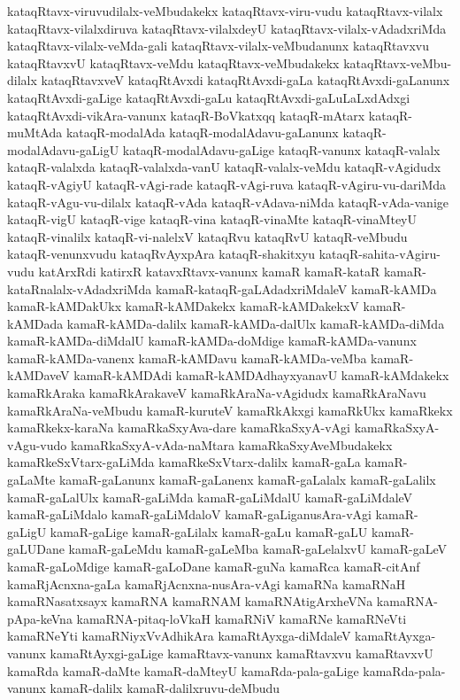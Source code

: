 {kataqRtavx-viruvudilalx-veMbudakekx
kataqRtavx-viru-vudu
kataqRtavx-vilalx
kataqRtavx-vilalxdiruva
kataqRtavx-vilalxdeyU
kataqRtavx-vilalx-vAdadxriMda
kataqRtavx-vilalx-veMda-gali
kataqRtavx-vilalx-veMbudanunx
kataqRtavxvu
kataqRtavxvU
kataqRtavx-veMdu
kataqRtavx-veMbudakekx
kataqRtavx-veMbu-dilalx
kataqRtavxveV
kataqRtAvxdi
kataqRtAvxdi-gaLa
kataqRtAvxdi-gaLanunx
kataqRtAvxdi-gaLige
kataqRtAvxdi-gaLu
kataqRtAvxdi-gaLuLaLxdAdxgi
kataqRtAvxdi-vikAra-vanunx
kataqR-BoVkatxqq
kataqR-mAtarx
kataqR-muMtAda
kataqR-modalAda
kataqR-modalAdavu-gaLanunx
kataqR-modalAdavu-gaLigU
kataqR-modalAdavu-gaLige
kataqR-vanunx
kataqR-valalx
kataqR-valalxda
kataqR-valalxda-vanU
kataqR-valalx-veMdu
kataqR-vAgidudx
kataqR-vAgiyU
kataqR-vAgi-rade
kataqR-vAgi-ruva
kataqR-vAgiru-vu-dariMda
kataqR-vAgu-vu-dilalx
kataqR-vAda
kataqR-vAdava-niMda
kataqR-vAda-vanige
kataqR-vigU
kataqR-vige
kataqR-vina
kataqR-vinaMte
kataqR-vinaMteyU
kataqR-vinalilx
kataqR-vi-nalelxV
kataqRvu
kataqRvU
kataqR-veMbudu
kataqR-venunxvudu
kataqRvAyxpAra
kataqR-shakitxyu
kataqR-sahita-vAgiru-vudu
katArxRdi
katirxR
katavxRtavx-vanunx
kamaR
kamaR-kataR
kamaR-kataRnalalx-vAdadxriMda
kamaR-kataqR-gaLAdadxriMdaleV
kamaR-kAMDa
kamaR-kAMDakUkx
kamaR-kAMDakekx
kamaR-kAMDakekxV
kamaR-kAMDada
kamaR-kAMDa-dalilx
kamaR-kAMDa-dalUlx
kamaR-kAMDa-diMda
kamaR-kAMDa-diMdalU
kamaR-kAMDa-doMdige
kamaR-kAMDa-vanunx
kamaR-kAMDa-vanenx
kamaR-kAMDavu
kamaR-kAMDa-veMba
kamaR-kAMDaveV
kamaR-kAMDAdi
kamaR-kAMDAdhayxyanavU
kamaR-kAMdakekx
kamaRkAraka
kamaRkArakaveV
kamaRkAraNa-vAgidudx
kamaRkAraNavu
kamaRkAraNa-veMbudu
kamaR-kuruteV
kamaRkAkxgi
kamaRkUkx
kamaRkekx
kamaRkekx-karaNa
kamaRkaSxyAva-dare
kamaRkaSxyA-vAgi
kamaRkaSxyA-vAgu-vudo
kamaRkaSxyA-vAda-naMtara
kamaRkaSxyAveMbudakekx
kamaRkeSxVtarx-gaLiMda
kamaRkeSxVtarx-dalilx
kamaR-gaLa
kamaR-gaLaMte
kamaR-gaLanunx
kamaR-gaLanenx
kamaR-gaLalalx
kamaR-gaLalilx
kamaR-gaLalUlx
kamaR-gaLiMda
kamaR-gaLiMdalU
kamaR-gaLiMdaleV
kamaR-gaLiMdalo
kamaR-gaLiMdaloV
kamaR-gaLiganusAra-vAgi
kamaR-gaLigU
kamaR-gaLige
kamaR-gaLilalx
kamaR-gaLu
kamaR-gaLU
kamaR-gaLUDane
kamaR-gaLeMdu
kamaR-gaLeMba
kamaR-gaLelalxvU
kamaR-gaLeV
kamaR-gaLoMdige
kamaR-gaLoDane
kamaR-guNa
kamaRca
kamaR-citAnf
kamaRjAcnxna-gaLa
kamaRjAcnxna-nusAra-vAgi
kamaRNa
kamaRNaH
kamaRNasatxsayx
kamaRNA
kamaRNAM
kamaRNAtigArxheVNa
kamaRNA-pApa-keVna
kamaRNA-pitaq-loVkaH
kamaRNiV
kamaRNe
kamaRNeVti
kamaRNeYti
kamaRNiyxVvAdhikAra
kamaRtAyxga-diMdaleV
kamaRtAyxga-vanunx
kamaRtAyxgi-gaLige
kamaRtavx-vanunx
kamaRtavxvu
kamaRtavxvU
kamaRda
kamaR-daMte
kamaR-daMteyU
kamaRda-pala-gaLige
kamaRda-pala-vanunx
kamaR-dalilx
kamaR-dalilxruvu-deMbudu
}
